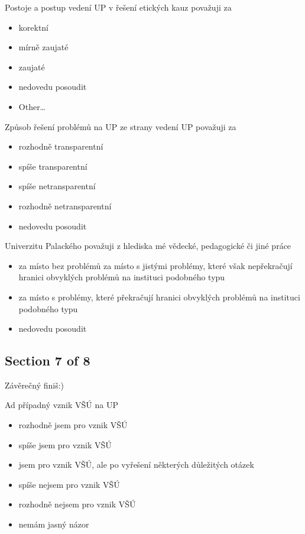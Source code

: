 Postoje a postup vedení UP v řešení etických kauz považuji za
\begin{itemize}
      \item korektní
      \item mírně zaujaté
      \item zaujaté
      \item nedovedu posoudit
      \item Other…
\end{itemize}

Způsob řešení problémů na UP ze strany vedení UP považuji za 
\begin{itemize}
      \item rozhodně transparentní
      \item spíše transparentní
      \item spíše netransparentní
      \item rozhodně netransparentní
      \item nedovedu posoudit
\end{itemize}

Univerzitu Palackého považuji z hlediska mé vědecké, pedagogické či jiné práce
\begin{itemize}
      \item za místo bez problémů
za místo s jistými problémy, které však nepřekračují hranici obvyklých problémů na instituci podobného typu
      \item za místo s problémy, které překračují hranici obvyklých problémů na instituci podobného typu
      \item nedovedu posoudit
\end{itemize}

\subsection{Section 7 of 8}
Závěrečný finiš:)

Ad případný vznik VŠÚ na UP
\begin{itemize}
      \item rozhodně jsem pro vznik VŠÚ
      \item spíše jsem pro vznik VŠÚ
      \item jsem pro vznik VŠÚ, ale po vyřešení některých důležitých otázek
      \item spíše nejsem pro vznik VŠÚ
      \item rozhodně nejsem pro vznik VŠÚ
      \item nemám jasný názor
\end{itemize}

